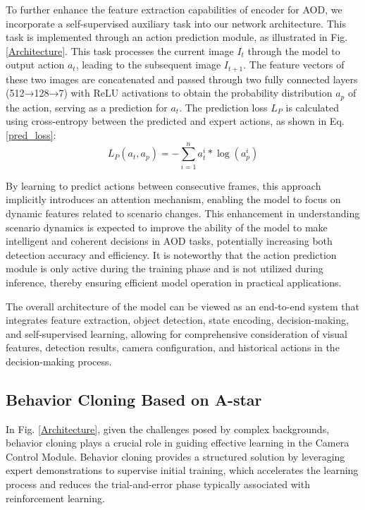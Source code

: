 \documentclass[lettersize,journal]{IEEEtran}
\begin{document}
To further enhance the  feature extraction capabilities of encoder for AOD, we incorporate a self-supervised auxiliary task into our network architecture. This task is implemented through an action prediction module, as illustrated in Fig. \ref{Architecture}. This task processes the current image $I_t$ through the model to output action $a_t$, leading to the subsequent image $I_{t+1}$. The feature vectors of these two images are concatenated and passed through two fully connected layers (512→128→7) with ReLU activations to obtain the probability distribution $a_p$ of the action, serving as a prediction for $a_t$. The prediction loss $L_{P}$ is calculated using cross-entropy between the predicted and expert actions, as shown in Eq. \ref{pred_loss}:
\begin{equation}
L_{P}\left( a_t,a_p \right) =-\sum_{i=1}^n{a_{t}^{i}*\log \left( a_{p}^{i} \right)}
\label{pred_loss}
\end{equation}

By learning to predict actions between consecutive frames, this approach implicitly introduces an attention mechanism, enabling the model to focus on dynamic features related to scenario changes. This enhancement in understanding scenario dynamics is expected to improve the ability of the model to make intelligent and coherent decisions in AOD tasks, potentially increasing both detection accuracy and efficiency. It is noteworthy that the action prediction module is only active during the training phase and is not utilized during inference, thereby ensuring efficient model operation in practical applications. 

The overall architecture of the model can be viewed as an end-to-end system that integrates feature extraction, object detection, state encoding, decision-making, and self-supervised learning, allowing for comprehensive consideration of visual features, detection results, camera configuration, and historical actions in the decision-making process.

\subsection{Behavior Cloning Based on A-star}
In Fig. \ref{Architecture}, given the challenges posed by complex backgrounds, behavior cloning plays a crucial role in guiding effective learning in the Camera Control Module. Behavior cloning provides a structured solution by leveraging expert demonstrations to supervise initial training, which accelerates the learning process and reduces the trial-and-error phase typically associated with reinforcement learning.
\end{document}
